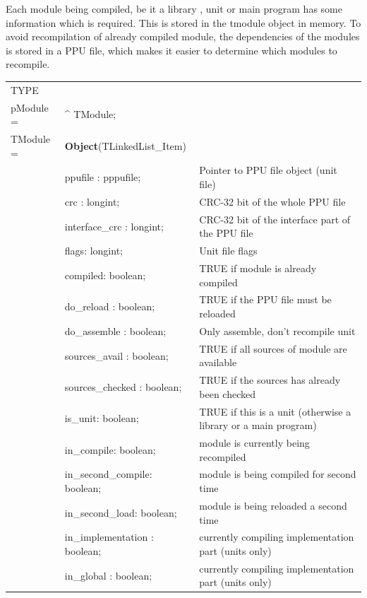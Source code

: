 \documentclass [a4paper,12pt]{article}
\begin{document}
Each module being compiled, be it a library , unit or main program has some
information which is required. This is stored in the tmodule object in
memory. To avoid recompilation of already compiled module, the dependencies
of the modules is stored in a PPU file, which makes it easier to determine
which modules to recompile.

\begin{longtable}{|l@{\extracolsep{\fill}}lp{7cm}|}
\hline
\endhead
\hline
\endfoot
\textsf{TYPE}& & \\
\xspace pModule = & \^{}  TModule; & \\
\xspace \textsf{TModule} = & \textbf{Object}(TLinkedList\_Item) & \\
&\textsf{ppufile : pppufile;}& Pointer to PPU file object (unit file) \\
&\textsf{crc : longint;}& CRC-32 bit of the whole PPU file \\
&\textsf{interface{\_}crc : longint;}& CRC-32 bit of the interface part of the PPU file \\
&\textsf{flags: longint;}& Unit file flags \\
&\textsf{compiled: boolean;}& TRUE if module is already compiled \\
&\textsf{do{\_}reload : boolean;}	& TRUE if the PPU file must be reloaded \\
&\textsf{do{\_}assemble : boolean;}	& Only assemble, don't recompile unit \\
&\textsf{sources{\_}avail : boolean;}	& TRUE if all sources of module are available \\
&\textsf{sources{\_}checked : boolean;}	& TRUE if the sources has already been checked \\
&\textsf{is{\_}unit: boolean;}		& TRUE if this is a unit (otherwise a library or a main program) \\
&\textsf{in{\_}compile: boolean;}	& module is currently being recompiled \\
&\textsf{in{\_}second{\_}compile: boolean;}& module is being compiled for second time \\
&\textsf{in{\_}second{\_}load: boolean;}	& module is being reloaded a second time \\
&\textsf{in{\_}implementation : boolean;}& currently compiling implementation part (units only) \\
&\textsf{in{\_}global : boolean;}	& currently compiling implementation part (units only) \\

\end{longtable}
\end{document}

